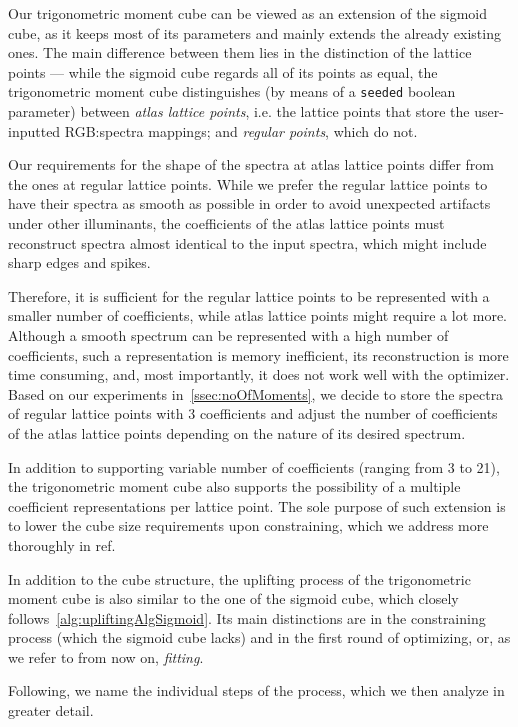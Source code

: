 Our trigonometric moment cube can be viewed as an extension of the sigmoid cube, as it keeps most of its parameters and mainly extends the already existing ones. The main difference between them lies in the distinction of the lattice points --- while the sigmoid cube regards all of its points as equal, the trigonometric moment cube distinguishes (by means of a \texttt{seeded} boolean parameter) between \emph{atlas lattice points}, i.e. the lattice points that store the user-inputted RGB:spectra mappings; and \emph{regular points}, which do not.

Our requirements for the shape of the spectra at atlas lattice points differ from the ones at regular lattice points. While we prefer the regular lattice points to have their spectra as smooth as possible in order to avoid unexpected artifacts under other illuminants, the coefficients of the atlas lattice points must reconstruct spectra almost identical to the input spectra, which might include sharp edges and spikes.

Therefore, it is sufficient for the regular lattice points to be represented with a smaller number of coefficients, while atlas lattice points might require a lot more. Although a smooth spectrum can be represented with a high number of coefficients, such a representation is memory inefficient, its reconstruction is more time consuming, and, most importantly, it does not work well with the optimizer. Based on our experiments in~\cref{ssec:noOfMoments}, we decide to store the spectra of regular lattice points with 3 coefficients and adjust the number of coefficients of the atlas lattice points depending on the nature of its desired spectrum.

In addition to supporting variable number of coefficients (ranging from 3 to 21), the trigonometric moment cube also supports the possibility of a multiple coefficient representations per lattice point. The sole purpose of such extension is to lower the cube size requirements upon constraining, which we address more thoroughly in ref.

In addition to the cube structure, the uplifting process of the trigonometric moment cube is also similar to the one of the sigmoid cube, which closely follows~\cref{alg:upliftingAlgSigmoid}. Its main distinctions are in the constraining process (which the sigmoid cube lacks) and in the first round of optimizing, or, as we refer to from now on, \emph{fitting}.

Following, we name the individual steps of the process, which we then analyze in greater detail.

